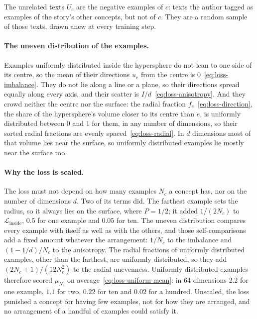 \documentclass[11pt]{article}
\theoremstyle{remark}
\begin{document}
The unrelated texts $U_c$ are the negative examples of $c$: texts the author tagged as examples of the story's other concepts, but not of $c$. They are a random sample of those texts, drawn anew at every training step.

\paragraph{The uneven distribution of the examples.} Examples uniformly distributed inside the hypersphere do not lean to one side of its centre, so the mean of their directions $u_e$ from the centre is $0$~\eqref{eq:loss-imbalance}. They do not lie along a line or a plane, so their directions spread equally along every axis, and their scatter is $I/d$~\eqref{eq:loss-anisotropy}. And they crowd neither the centre nor the surface: the radial fraction $f_e$~\eqref{eq:loss-direction}, the share of the hypersphere's volume closer to its centre than $e$, is uniformly distributed between $0$ and $1$ for them, in any number of dimensions, so their sorted radial fractions are evenly spaced~\eqref{eq:loss-radial}. In $d$ dimensions most of that volume lies near the surface, so uniformly distributed examples lie mostly near the surface too.

\paragraph{Why the loss is scaled.} The loss must not depend on how many examples $N_c$ a concept has, nor on the number of dimensions $d$. Two of its terms did. The farthest example sets the radius, so it always lies on the surface, where $P = 1/2$; it added $1/(2N_c)$ to $\mathcal{L}_{\mathrm{inside}}$, $0.5$ for one example and $0.05$ for ten. The uneven distribution compares every example with itself as well as with the others, and those self-comparisons add a fixed amount whatever the arrangement: $1/N_c$ to the imbalance and $(1 - 1/d)/N_c$ to the anisotropy. The radial fractions of uniformly distributed examples, other than the farthest, are uniformly distributed, so they add $(2N_c + 1)/(12N_c^2)$ to the radial unevenness. Uniformly distributed examples therefore scored $\mu_{N_c}$ on average~\eqref{eq:loss-uniform-mean}: in $64$ dimensions $2.2$ for one example, $1.1$ for two, $0.22$ for ten and $0.02$ for a hundred. Unscaled, the loss punished a concept for having few examples, not for how they are arranged, and no arrangement of a handful of examples could satisfy it.
\end{document}
